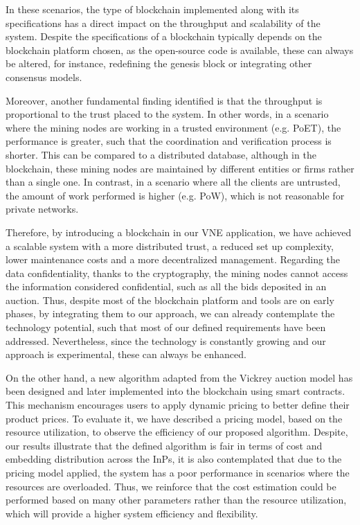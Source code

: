 In these scenarios, the type of blockchain implemented along with its specifications has a direct impact on the throughput and scalability of the system. Despite the specifications of a blockchain typically depends on the blockchain platform chosen, as the open-source code is available, these can always be altered, for instance, redefining the genesis block or integrating other consensus models.

Moreover, another fundamental finding identified is that the throughput is proportional to the trust placed to the system. In other words, in a scenario where the mining nodes are working in a trusted environment (e.g. PoET), the performance is greater, such that the coordination and verification process is shorter. This can be compared to a distributed database, although in the blockchain, these mining nodes are maintained by different entities or firms rather than a single one. In contrast, in a scenario where all the clients are untrusted, the amount of work performed is higher (e.g. PoW), which is not reasonable for private networks. 

Therefore, by introducing a blockchain in our VNE application, we have achieved a scalable system with a more distributed trust, a reduced set up complexity, lower maintenance costs and a more decentralized management. Regarding the data confidentiality, thanks to the cryptography, the mining nodes cannot access the information considered confidential, such as all the bids deposited in an auction. Thus, despite most of the blockchain platform and tools are on early phases, by integrating them to our approach, we can already contemplate the technology potential, such that most of our defined requirements have been addressed. Nevertheless, since the technology is constantly growing and our approach is experimental, these can always be enhanced.

On the other hand, a new algorithm adapted from the Vickrey auction model has been designed and later implemented into the blockchain using smart contracts. This mechanism encourages users to apply dynamic pricing to better define their product prices. To evaluate it, we have described a pricing model, based on the resource utilization, to observe the efficiency of our proposed algorithm. Despite, our results illustrate that the defined algorithm is fair in terms of cost and embedding distribution across the InPs, it is also contemplated that due to the pricing model applied, the system has a poor performance in scenarios where the resources are overloaded. Thus, we reinforce that the cost estimation could be performed based on many other parameters rather than the resource utilization, which will provide a higher system efficiency and flexibility.

